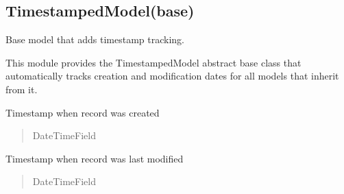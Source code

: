 \documentclass[a4paper,12pt,ngerman]{sphinxmanual}
\begin{document}
\subsection{TimestampedModel(base)}
\label{\detokenize{sections/models:timestampedmodel-base}}\label{\detokenize{sections/models:module-pages_app.models.base}}
\sphinxAtStartPar
Base model that adds timestamp tracking.

\sphinxAtStartPar
This module provides the TimestampedModel abstract base class that automatically
tracks creation and modification dates for all models that inherit from it.

\begin{fulllineitems}
\label{\detokenize{sections/models:pages_app.models.base.created_at}}
\pysigstartsignatures
\pysigline
{}
\pysigstopsignatures
\sphinxAtStartPar
Timestamp when record was created
\begin{quote}\begin{description}
\sphinxAtStartPar
DateTimeField

\end{description}\end{quote}

\end{fulllineitems}


\begin{fulllineitems}
\label{\detokenize{sections/models:pages_app.models.base.updated_at}}
\pysigstartsignatures
\pysigline
{}
\pysigstopsignatures
\sphinxAtStartPar
Timestamp when record was last modified
\begin{quote}\begin{description}
\sphinxAtStartPar
DateTimeField

\end{description}\end{quote}

\end{fulllineitems}
\end{document}
